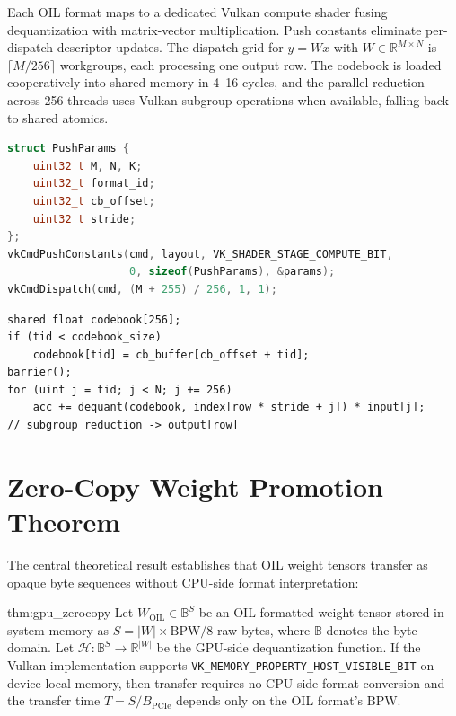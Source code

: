 Each OIL format maps to a dedicated Vulkan compute shader fusing
dequantization with matrix-vector multiplication. Push constants eliminate
per-dispatch descriptor updates. The dispatch grid for $y = Wx$ with
$W \in \mathbb{R}^{M \times N}$ is $\lceil M / 256 \rceil$ workgroups, each
processing one output row. The codebook is loaded cooperatively into shared
memory in 4--16 cycles, and the parallel reduction across 256 threads uses
Vulkan subgroup operations when available, falling back to shared atomics.

\begin{lstlisting}[language=C++,caption=Push constants and kernel]
struct PushParams {
    uint32_t M, N, K;
    uint32_t format_id;
    uint32_t cb_offset;
    uint32_t stride;
};
vkCmdPushConstants(cmd, layout, VK_SHADER_STAGE_COMPUTE_BIT,
                   0, sizeof(PushParams), &params);
vkCmdDispatch(cmd, (M + 255) / 256, 1, 1);
\end{lstlisting}

\begin{verbatim}
shared float codebook[256];
if (tid < codebook_size)
    codebook[tid] = cb_buffer[cb_offset + tid];
barrier();
for (uint j = tid; j < N; j += 256)
    acc += dequant(codebook, index[row * stride + j]) * input[j];
// subgroup reduction -> output[row]
\end{verbatim}

\section{Zero-Copy Weight Promotion Theorem}
\label{sec:zero_copy}

The central theoretical result establishes that OIL weight tensors transfer as
opaque byte sequences without CPU-side format interpretation:

\begin{mythm}{thm:gpu_zerocopy}
Let $W_{\mathrm{OIL}} \in \mathbb{B}^{S}$ be an OIL-formatted weight tensor
stored in system memory as $S = |W| \times \mathrm{BPW} / 8$ raw bytes, where
$\mathbb{B}$ denotes the byte domain. Let $\mathcal{H}: \mathbb{B}^{S} \to
\mathbb{R}^{|W|}$ be the GPU-side dequantization function. If the Vulkan
implementation supports
\texttt{VK\_MEMORY\_PROPERTY\_HOST\_VISIBLE\_BIT} on device-local memory, then
transfer requires no CPU-side format conversion and the transfer time $T =
S / B_{\mathrm{PCIe}}$ depends only on the OIL format's BPW.
\end{mythm}

